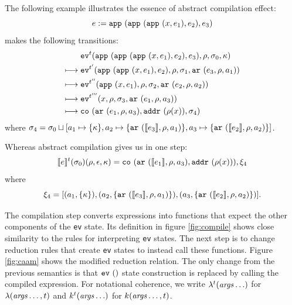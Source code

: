 \documentclass[preprint,onecolumn,9pt]{sigplanconf} %
\begin{document}
The following example illustrates
the essence of abstract compilation effect:
\[
\mexp := \sapp{\sapp{\sapp\mvar{\mexp_1}}{\mexp_2}}{\mexp_3}
\]
makes the following transitions:
\begin{align}
& \ev[^\mcntr]{\sapp{\sapp{\sapp\mvar{\mexp_1}}{\mexp_2}}{\mexp_3},\menv,\msto_0,\mkont}\\
\machstep\; &
\ev[^{\mcntr'}]{\sapp{\sapp\mvar{\mexp_1}}{\mexp_2},\menv,\msto_1,\kar{\mexp_3,\menv,\maddr_1}}
\\
\machstep\; &
\ev[^{\mcntr''}]{\sapp\mvar{\mexp_1},\menv,\msto_2,\kar{\mexp_2,\menv,\maddr_2}}
\\
\machstep\; &
\ev[^{\mcntr'''}]{\mvar, \menv,\msto_3,\kar{\mexp_1,\menv,\maddr_3}} %
\\
\machstep\; &
\spchoice
{\co{\kar{\mexp_1,\menv,\maddr_3},\saddr{\menv(\mvar)},\msto_4}}
{\co{\kar{\mexp_1,\menv,\maddr_{f3},\maddr_{a3},\maddr_3},\superposition{\msto_4(\menv(\mvar))},\msto_4}}
\end{align}
where \(
\msto_4 = \msto_0 \sqcup [\maddr_1 \mapsto \setof{\mkont},
\maddr_2 \mapsto \setof{\kar{\compile{\mexp_3},\menv,\maddr_1}},
\maddr_3 \mapsto \setof{\kar{\compile{\mexp_2},\menv,\maddr_2}}]\).

Whereas abstract compilation gives us in one step:
\begin{align*}
\compile{\mexp}^\mcntr(\msto_0)(\menv,\epsilon,\mkont) =
\spchoice
{\co{\kar{\compile{\mexp_1},\menv,\maddr_3},\saddr{\menv(\mvar)}},\msdiff_4}
{\co{\kar{\compile{\mexp_1},\menv,\maddr_{f3},\maddr_{a3},\maddr_3},\superposition{\msto'_4(\menv(\mvar))},\msto'_4}}
\end{align*}
where
\begin{equation*}
\msdiff_4 = [\ttuple{\maddr_1}{\setof{\mkont}},
             \ttuple{\maddr_2}{\setof{\kar{\compile{\mexp_3},\menv,\maddr_1}}},
             \ttuple{\maddr_3}{\setof{\kar{\compile{\mexp_2},\menv,\maddr_2}}}]\text.
\end{equation*}

The compilation step converts expressions into functions that expect
the other components of the {\tt ev} state. Its definition in figure
\ref{fig:compile} shows close similarity to the rules for interpreting
{\tt ev} states. The next step is to change reduction rules that
create {\tt ev} states to instead call these functions. Figure
\ref{fig:caam} shows the modified reduction relation. The only change
from the previous semantics is that $\ev{}$ state construction is
replaced by calling the compiled expression. For notational coherence,
we write $\lambda^\mcntr(\mathit{args} \ldots)$ for
$\lambda(\mathit{args} \ldots, \mcntr)$ and
$\mcomp^\mcntr(\mathit{args}\ldots)$ for $\mcomp(\mathit{args}\ldots,
\mcntr)$.
\end{document}
